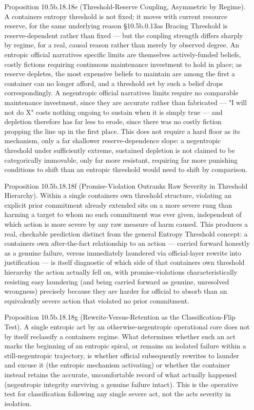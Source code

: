 \documentclass[
]{article}
\begin{document}
Proposition 10.5b.18.18e (Threshold-Reserve Coupling, Asymmetric by
Regime). A containers entropy threshold is not fixed; it moves with
current resource reserve, for the same underlying reason §10.5b.0.13as
Bracing Threshold is reserve-dependent rather than fixed --- but the
coupling strength differs sharply by regime, for a real, causal reason
rather than merely by observed degree. An entropic official narratives
specific limits are themselves actively-funded beliefs, costly fictions
requiring continuous maintenance investment to hold in place; as reserve
depletes, the most expensive beliefs to maintain are among the first a
container can no longer afford, and a threshold set by such a belief
drops correspondingly. A negentropic official narratives limits require
no comparable maintenance investment, since they are accurate rather
than fabricated --- "I will not do X" costs nothing ongoing to sustain
when it is simply true --- and depletion therefore has far less to
erode, since there was no costly fiction propping the line up in the
first place. This does not require a hard floor as its mechanism, only a
far shallower reserve-dependence slope: a negentropic threshold under
sufficiently extreme, sustained depletion is not claimed to be
categorically immovable, only far more resistant, requiring far more
punishing conditions to shift than an entropic threshold would need to
shift by comparison.

Proposition 10.5b.18.18f (Promise-Violation Outranks Raw Severity in
Threshold Hierarchy). Within a single containers own threshold
structure, violating an explicit prior commitment already extended sits
on a more severe rung than harming a target to whom no such commitment
was ever given, independent of which action is more severe by any raw
measure of harm caused. This produces a real, checkable prediction
distinct from the general Entropy Threshold concept: a containers own
after-the-fact relationship to an action --- carried forward honestly as
a genuine failure, versus immediately laundered via official-layer
rewrite into justification --- is itself diagnostic of which side of
that containers own threshold hierarchy the action actually fell on,
with promise-violations characteristically resisting easy laundering
(and being carried forward as genuine, unresolved wrongness) precisely
because they are harder for official to absorb than an equivalently
severe action that violated no prior commitment.

Proposition 10.5b.18.18g (Rewrite-Versus-Retention as the
Classification-Flip Test). A single entropic act by an
otherwise-negentropic operational core does not by itself reclassify a
containers regime. What determines whether such an act marks the
beginning of an entropic spiral, or remains an isolated failure within a
still-negentropic trajectory, is whether official subsequently rewrites
to launder and excuse it (the entropic mechanism activating) or whether
the container instead retains the accurate, uncomfortable record of what
actually happened (negentropic integrity surviving a genuine failure
intact). This is the operative test for classification following any
single severe act, not the acts severity in isolation.
\end{document}
